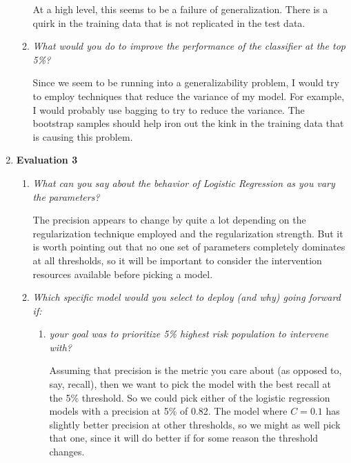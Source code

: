 \documentclass[11pt]{article}
\begin{document}
\begin{enumerate}
\begin{enumerate}
                At a high level, this seems to be a failure of generalization.
                There is a quirk in the training data that is not replicated in
                the test data.

            \item \textit{What would you do to improve the performance of the
                classifier at the top 5\%?}

                Since we seem to be running into a generalizability problem, I
                would try to employ techniques that reduce the variance of my
                model. For example, I would probably use bagging to try to
                reduce the variance. The bootstrap samples should help iron out
                the kink in the training data that is causing this problem.
        \end{enumerate}

    \item \textbf{Evaluation 3}
        \begin{enumerate}
            \item \textit{What can you say about the behavior of Logistic
                Regression as you vary the parameters?}

                The precision appears to change by quite a lot depending on the
                regularization technique employed and the regularization
                strength. But it is worth pointing out that no one set of
                parameters completely dominates at all thresholds, so it will
                be important to consider the intervention resources available
                before picking a model.

            \item \textit{Which specific model would you select to deploy (and
                why) going forward if:}
                \begin{enumerate}
                    \item \textit{your goal was to prioritize 5\% highest risk
                        population to intervene with?}

                        Assuming that precision is the metric you care about
                        (as opposed to, say, recall), then we want to pick the
                        model with the best recall at the 5\% threshold. So we
                        could pick either of the logistic regression models
                        with a precision at 5\% of 0.82. The model where $C
                        =0.1$ has slightly better precision at other
                        thresholds, so we might as well pick that one, since it
                        will do better if for some reason the threshold
                        changes.


\end{enumerate}
\end{enumerate}
\end{enumerate}
\end{document}
